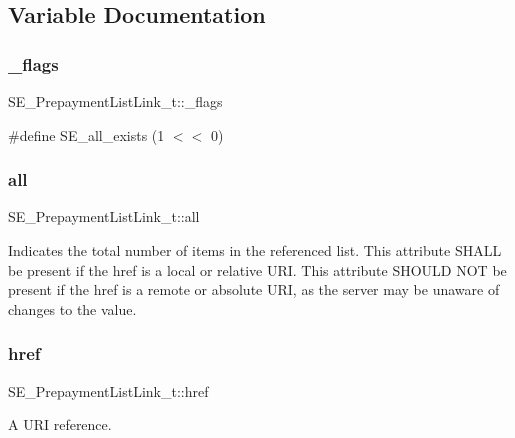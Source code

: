 \subsection{Variable Documentation}
\mbox{\label{group__PrepaymentListLink_ga261f83524411826f6b3447e29723d0e1}} 
\subsubsection{\texorpdfstring{\+\_\+flags}{\_flags}}
{\footnotesize\ttfamily S\+E\+\_\+\+Prepayment\+List\+Link\+\_\+t\+::\+\_\+flags}

\#define S\+E\+\_\+all\+\_\+exists (1 $<$$<$ 0) \mbox{\label{group__PrepaymentListLink_ga7f7296815f5a0d80f024c5ae2d1561ce}} 
\subsubsection{\texorpdfstring{all}{all}}
{\footnotesize\ttfamily S\+E\+\_\+\+Prepayment\+List\+Link\+\_\+t\+::all}

Indicates the total number of items in the referenced list. This attribute S\+H\+A\+LL be present if the href is a local or relative U\+RI. This attribute S\+H\+O\+U\+LD N\+OT be present if the href is a remote or absolute U\+RI, as the server may be unaware of changes to the value. \mbox{\label{group__PrepaymentListLink_gaa4762fcd0cb0e237cc9087b4bafef73d}} 
\subsubsection{\texorpdfstring{href}{href}}
{\footnotesize\ttfamily S\+E\+\_\+\+Prepayment\+List\+Link\+\_\+t\+::href}

A U\+RI reference. 